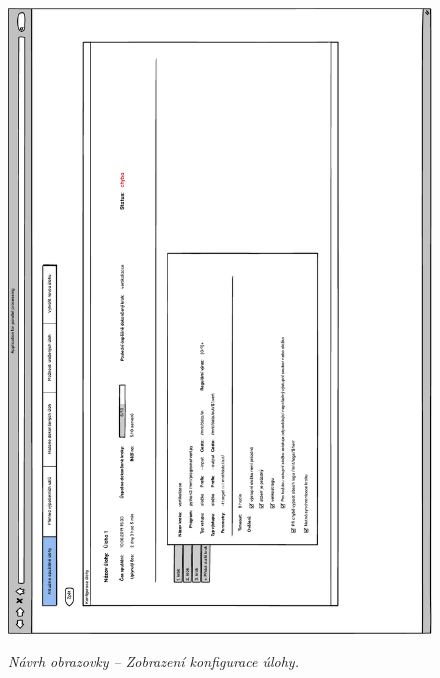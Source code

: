 \begin{figure}[H]
\begin{center}
    \scalebox{0.78}
    {   
        \includegraphics{images/wireframe_appendix_TaskConfig.pdf}
    }
    \caption{\label{obr:wireframe_appendix_TaskConfig} {\it Návrh obrazovky -- Zobrazení konfigurace úlohy.}}
\end{center}
\end{figure}


